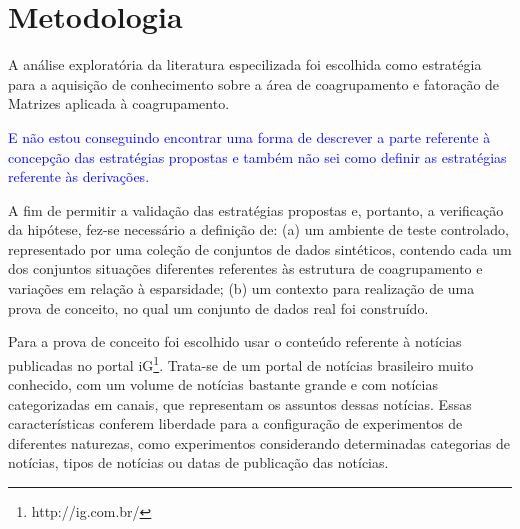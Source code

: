 \documentclass[
    12pt,                %
    oneside,            %
    a4paper,            %
    english,            %
    brazil                %
    ]{abntex2ppgsi}
\begin{document}


\section{Metodologia}

A análise exploratória da literatura especilizada foi escolhida como estratégia para a aquisição de conhecimento sobre a área de coagrupamento e fatoração de Matrizes aplicada à coagrupamento.

\textcolor{blue}{E não estou conseguindo encontrar uma forma de descrever a parte referente à concepção das estratégias propostas e também não sei como definir as estratégias referente às derivações.}


A fim de permitir a validação das estratégias propostas e, portanto, a verificação da  hipótese, fez-se necessário a definição de: (a) um ambiente de teste controlado, representado por uma coleção de conjuntos de dados sintéticos, contendo cada um dos conjuntos situações diferentes referentes às estrutura de coagrupamento e variações em relação à esparsidade;  (b) um contexto para realização de uma prova de conceito, no qual um conjunto de dados real foi construído.

Para a prova de conceito foi escolhido usar o conteúdo referente à notícias publicadas no portal iG\footnote{http://ig.com.br/}.
Trata-se de um portal de notícias brasileiro muito conhecido, com um volume de notícias bastante grande e com notícias categorizadas em canais, que representam os assuntos dessas notícias. Essas características conferem liberdade para a configuração de experimentos de diferentes naturezas, como experimentos considerando determinadas categorias de notícias, tipos de notícias ou datas de publicação das notícias.
\end{document}

